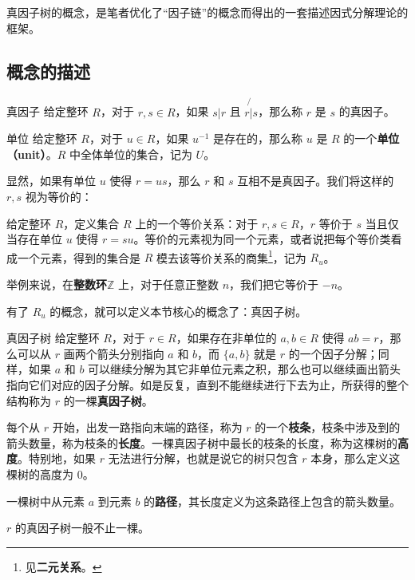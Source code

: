 

真因子树的概念，是笔者优化了“因子链”的概念而得出的一套描述因式分解理论的框架。

\subsection{概念的描述}

\begin{definition}{真因子}
给定整环 $R$，对于 $r, s\in R$，如果 $s|r$ 且 $r\not{|}s$，那么称 $r$ 是 $s$ 的真因子。
\end{definition}

\begin{definition}{单位}\label{FctTre_def3}
给定整环 $R$，对于 $u\in R$，如果 $u^{-1}$ 是存在的，那么称 $u$ 是 $R$ 的一个\textbf{单位（unit）}。$R$ 中全体单位的集合，记为 $U$。
\end{definition}

显然，如果有单位 $u$ 使得 $r=us$，那么 $r$ 和 $s$ 互相不是真因子。我们将这样的 $r, s$ 视为等价的：

\begin{definition}{}\label{FctTre_def2}
给定整环 $R$，定义集合 $R$ 上的一个等价关系：对于 $r, s\in R$，$r$ 等价于 $s$ 当且仅当存在单位 $u$ 使得 $r=su$。等价的元素视为同一个元素，或者说把每个等价类看成一个元素，得到的集合是 $R$ 模去该等价关系的商集\footnote{见\textbf{二元关系}。}，记为 $R_u$。
\end{definition}

举例来说，在\textbf{整数环}$\mathbb{Z}$ 上，对于任意正整数 $n$，我们把它等价于 $-n$。


有了 $R_u$ 的概念，就可以定义本节核心的概念了：真因子树。

\begin{definition}{真因子树}
给定整环 $R$，对于 $r\in R$，如果存在非单位的 $a, b\in R$ 使得 $ab=r$，那么可以从 $r$ 画两个箭头分别指向 $a$ 和 $b$，而 $\{a, b\}$ 就是 $r$ 的一个因子分解；同样，如果 $a$ 和 $b$ 可以继续分解为其它非单位元素之积，那么也可以继续画出箭头指向它们对应的因子分解。如是反复，直到不能继续进行下去为止，所获得的整个结构称为 $r$ 的一棵\textbf{真因子树}。

每个从 $r$ 开始，出发一路指向末端的路径，称为 $r$ 的一个\textbf{枝条}，枝条中涉及到的箭头数量，称为枝条的\textbf{长度}。一棵真因子树中最长的枝条的长度，称为这棵树的\textbf{高度}。特别地，如果 $r$ 无法进行分解，也就是说它的树只包含 $r$ 本身，那么定义这棵树的高度为 $0$。

一棵树中从元素 $a$ 到元素 $b$ 的\textbf{路径}，其长度定义为这条路径上包含的箭头数量。

$r$ 的真因子树一般不止一棵。
\end{definition}

